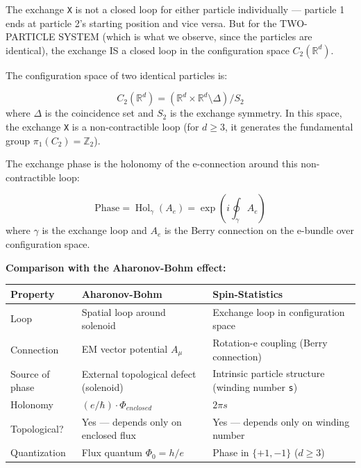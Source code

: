 \documentclass[aps,prd,preprint,superscriptaddress,longbibliography,floatfix]{revtex4-2}
\theoremstyle{remark}
\begin{document}
The exchange \texttt{X} is not a closed loop for either particle individually --- particle 1 ends at particle 2's starting position and vice versa. But for the TWO-PARTICLE SYSTEM (which is what we observe, since the particles are identical), the exchange IS a closed loop in the configuration space $C_{2}(\mathbb{R}^{d})$.

The configuration space of two identical particles is:


\begin{equation}
    C_{2}(\mathbb{R}^{d}) = (\mathbb{R}^{d} \times \mathbb{R}^{d} \setminus \Delta) / S_{2}
\end{equation}
where $\Delta$ is the coincidence set and $S_{2}$ is the exchange symmetry. In this space, the exchange \texttt{X} is a non-contractible loop (for $d \geq 3$, it generates the fundamental group $\pi_{1}(C_{2}) = \mathbb{Z}_{2}$).

The exchange phase is the holonomy of the e-connection around this non-contractible loop:


\begin{equation}
    \text{Phase} = \operatorname{Hol}_\gamma(A_e) = \exp(i \oint_\gamma A_e)
\end{equation}
where $\gamma$ is the exchange loop and $A_e$ is the Berry connection on the e-bundle over configuration space.

\textbf{Comparison with the Aharonov-Bohm effect:}


\begin{table}[H]
\begin{ruledtabular}
\begin{tabular}{p{5.0cm}p{5.0cm}p{5.0cm}}
Property & Aharonov-Bohm & Spin-Statistics \\
\hline
Loop & Spatial loop around solenoid & Exchange loop in configuration space \\
Connection & EM vector potential $A_\mu$ & Rotation-e coupling (Berry connection) \\
Source of phase & External topological defect (solenoid) & Intrinsic particle structure (winding number \texttt{s}) \\
Holonomy & $(e/\hbar) \cdot \Phi_{enclosed}$ & $2\pi s$ \\
Topological? & Yes --- depends only on enclosed flux & Yes --- depends only on winding number \\
Quantization & Flux quantum $\Phi_{0} = h/e$ & Phase in $\{+1, -1\}$ ($d \geq 3$) \\
\end{tabular}
\end{ruledtabular}
\end{table}
\end{document}
